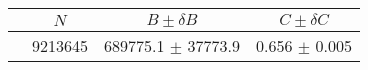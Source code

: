 \begin{tabular}{lccc}
\hline
    &   $N$   & $B \pm \delta B$  &  $C \pm \delta C$ \\
\hline
                               & 9213645    & 689775.1   $\pm$ 37773.9 & 0.656      $\pm$ 0.005 \\
\hline
\end{tabular}
